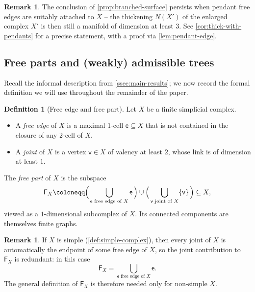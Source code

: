 \documentclass[reqno]{amsart}
\theoremstyle{definition}
\newtheorem{definition}[theorem]{Definition}
\newtheorem{remark}[theorem]{Remark}
\newcommand\sfe{\mathsf{e}}
\newcommand\sfv{\mathsf{v}}
\numberwithin{equation}{section}
\begin{document}
\begin{remark}\label{rem:branched-surface-pendant}
The conclusion of \cref{prop:branched-surface} persists when
pendant free edges are suitably attached to \(X\) -- the
thickening \(N(X')\) of the enlarged complex \(X'\) is then
still a manifold of dimension at least \(3\). See
\cref{cor:thick-with-pendants} for a precise statement, with a
proof via \cref{lem:pendant-edge}.
\end{remark}

\subsection{Free parts and (weakly) admissible trees}
\label{ssec:free-parts}

Recall the informal description from
\cref{ssec:main-results}; we now record the formal
definition we will use throughout the remainder of the paper.

\begin{definition}[Free edge and free part]
\label{def:free-part}
Let \(X\) be a finite simplicial complex.
\begin{itemize}[leftmargin=2em]
    \item A \emph{free edge} of \(X\) is a maximal \(1\)-cell
          \(\sfe\subseteq X\) that is not contained in the closure of
          any \(2\)-cell of \(X\).
    \item A \emph{joint} of \(X\) is a vertex \(\sfv\in X\) of valency at least \(2\), whose link is of dimension at least \(1\).
\end{itemize}
The \emph{free part} of \(X\) is the subspace
\[
\mathsf{F}_X \coloneqq
\Bigl(\,\bigcup_{\sfe\text{ free edge of } X} \sfe\,\Bigr)
\cup
\Bigl(\,\bigcup_{\sfv\text{ joint of }X} \{\sfv\}\,\Bigr)
\subseteq X,
\]
viewed as a \(1\)-dimensional subcomplex of \(X\). Its connected
components are themselves finite graphs.
\end{definition}

\begin{remark}\label{rem:joint-redundant-simple}
If \(X\) is simple (\cref{def:simple-complex}), then
every joint of \(X\) is automatically the endpoint of some free
edge of \(X\), so the joint contribution to \(\mathsf{F}_X\) is
redundant: in this case
\[
\mathsf{F}_X = \bigcup_{\sfe\text{ free edge of } X} \sfe.
\]
The general definition of \(\mathsf{F}_X\) is therefore needed only
for non-simple \(X\).
\end{remark}
\end{document}
